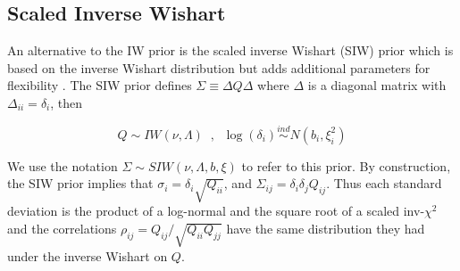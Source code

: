 \documentclass[12pt]{article}
\begin{document}


\subsection{Scaled Inverse Wishart \label{sec:siw}}

An alternative to the IW prior is the scaled inverse Wishart (SIW) prior which is based on the inverse Wishart distribution but adds additional parameters for flexibility \citep{odomain}. The SIW prior defines $\Sigma \equiv \Delta Q \Delta $ where $\Delta$ is a diagonal matrix with $\Delta_{ii}=\delta_i$, then 

\begin{equation}
Q \sim  IW(\nu, \Lambda) \;\;, \;\; \log(\delta_i) \stackrel{ind} \sim N(b_i, \xi_i^2)
\label{eq:siw}
\end{equation} 

We use the notation $\Sigma \sim SIW(\nu, \Lambda, b, \xi)$ to refer to this prior.  By construction, the SIW prior implies that $\sigma_i = \delta_i \sqrt{Q_{ii}}$, and $\Sigma_{ij}=\delta_i\delta_jQ_{ij}$. Thus each standard deviation is the product of a log-normal and the square root of a scaled inv-$\chi^2$ and the correlations $\rho_{ij} = Q_{ij}/\sqrt{Q_{ii}Q_{jj}}$ have the same distribution they had under the inverse Wishart on $Q$.  

\end{document}
